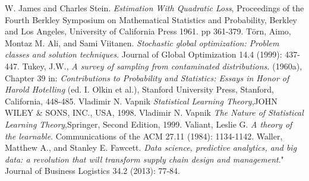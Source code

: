 \documentclass{book}
\theoremstyle{plain}
\theoremstyle{definition}
\theoremstyle{remark}
\begin{document}
\begin{thebibliography}{9}
 W. James and Charles Stein. \emph{Estimation With Quadratic Loss},  Proceedings of the Fourth Berkley Symposium on Mathematical Statistics and Probability, Berkley and Los Angeles, University of California Press 1961. pp 361-379.
 Törn, Aimo, Montaz M. Ali, and Sami Viitanen. \emph{Stochastic global optimization: Problem classes and solution techniques}. Journal of Global Optimization 14.4 (1999): 437-447.
 Tukey, J.W., \emph{A survey of sampling from contaminated distributions.} (1960a), Chapter 39 in: \emph{Contributions to Probability and Statistics: Essays in Honor of Harold Hotelling} (ed. I. Olkin et al.), Stanford University Press, Stanford, California, 448-485.
 Vladimir N. Vapnik  \emph{Statistical Learning Theory},JOHN WILEY \& SONS, INC., USA, 1998.
 Vladimir N. Vapnik  \emph{The Nature of Statistical Learning Theory},Springer, Second Edition, 1999.
 Valiant, Leslie G. \emph{A theory of the learnable}. Communications of the ACM 27.11 (1984): 1134-1142.
 Waller, Matthew A., and Stanley E. Fawcett. \emph{Data science, predictive analytics, and big data: a revolution that will transform supply chain design and management}." Journal of Business Logistics 34.2 (2013): 77-84.

\end{thebibliography}
\end{document}
